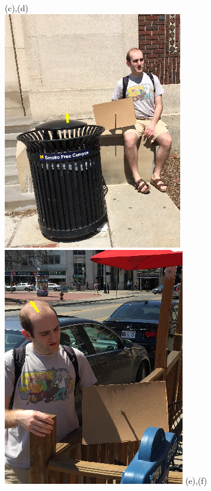 \documentclass[10pt,twocolumn,letterpaper]{article}
\begin{document}
\begin{figure}[h]
(c),(d)\\
\includegraphics[scale = 0.35]{garbage_can.png}
\includegraphics[scale = 0.35]{nathan_2.png}
(e),(f)
\end{figure}
\end{document}
